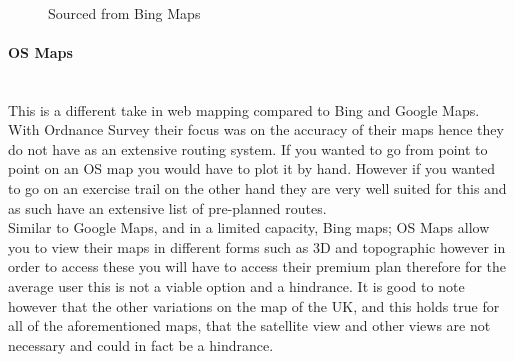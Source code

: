 \begin{flushleft}
            \bk
 
            \begin{figure}[H]
                \centering
                \caption*{Sourced from Bing Maps\textsuperscript{\tiny\textcopyright}}
            \end{figure}

            \bk

            \paragraph{OS Maps} \mbox{} \\
            This is a different take in web mapping compared to Bing and Google Maps. With Ordnance Survey their focus was on the accuracy of their maps hence they do not have as an extensive routing system.
            If you wanted to go from point to point on an OS map you would have to plot it by hand. However if you wanted to go on an exercise trail on the other hand they are very well suited
            for this and as such have an extensive list of pre-planned routes. \\
            \bk
            Similar to Google Maps, and in a limited capacity, Bing maps; OS Maps allow you to view their maps in different forms such as 3D and topographic however in order to access these you will
            have to access their premium plan therefore for the average user this is not a viable option and a hindrance. It is good to note however that the other variations on the map of the UK,
            and this holds true for all of the aforementioned maps, that the satellite view and other views are not necessary and could in fact be a hindrance. \\
            
            \bk
            

\end{flushleft}
